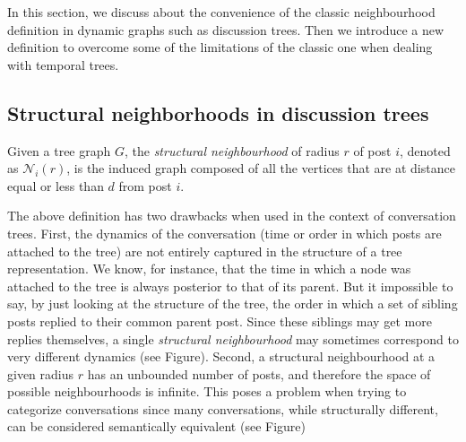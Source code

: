 \documentclass[smallextended]{svjour3}          %
\begin{document}
In this section, we discuss about the convenience of the classic neighbourhood definition in dynamic graphs such as discussion trees. Then we introduce a new definition to overcome some of the limitations of the classic one when dealing with temporal trees.

\subsection{Structural neighborhoods in discussion trees}

\begin{definition}
Given a tree graph $G$, the \textit{structural neighbourhood} of radius $r$ of post $i$, denoted as $\mathcal{N}_i(r)$, is the induced graph composed of all the vertices that are at distance equal or less than $d$ from post $i$.
\end{definition}

The above definition has two drawbacks when used in the context of conversation trees.
First, the dynamics of the conversation (time or order in which posts are attached to the tree) are not entirely captured in the structure of a tree representation. We know, for instance, that the time in which a node was attached to the tree is always posterior to that of its parent. But it impossible to say, by just looking at the structure of the tree, the order in which a set of sibling posts replied to their common parent post. Since these siblings may get more replies themselves, a single \textit{structural neighbourhood} may sometimes correspond to very different dynamics (see Figure).
Second, a structural neighbourhood at a given radius $r$ has an unbounded number of posts, and therefore the space of possible neighbourhoods is infinite. This poses a problem when trying to categorize conversations since many conversations, while structurally different, can be considered semantically equivalent (see Figure)
\end{document}
